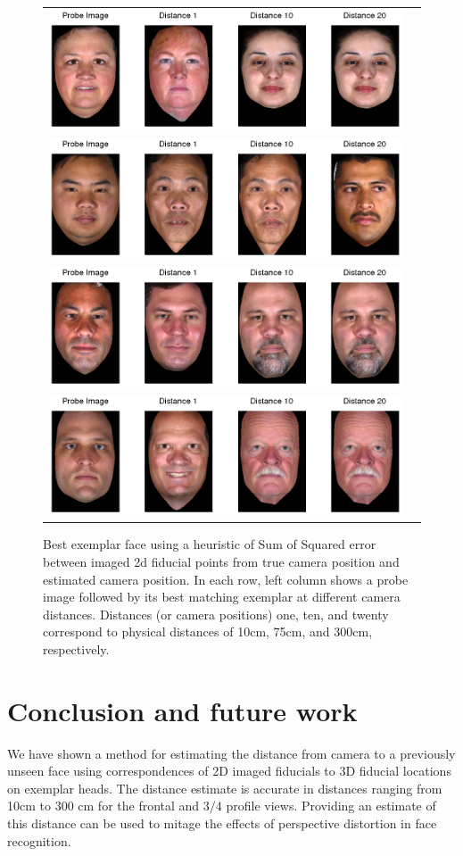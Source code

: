 \documentclass[runningheads]{llncs}
\begin{document}
\begin{figure}[h]
\centering
\begin{tabular}{cc}
\includegraphics[width=.7\linewidth]{resources/figures/best_exemplar1.png} \\
\includegraphics[width=.7\linewidth]{resources/figures/best_exemplar3.png} \\
\includegraphics[width=.7\linewidth]{resources/figures/best_exemplar10.png} \\
\includegraphics[width=.7\linewidth]{resources/figures/best_exemplar26.png}
\end{tabular}
\caption{Best exemplar face using a heuristic of Sum of Squared error between imaged 2d fiducial points from true camera position and estimated camera position.  In each row, left column shows a probe image followed by its best matching exemplar at different camera distances. Distances (or camera positions) one, ten, and twenty correspond to physical distances of 10cm, 75cm, and 300cm, respectively. }
\label{fig:bestexemplar}
\end{figure}

\section{Conclusion and future work} \label{sec:discussion}
We have shown a method for estimating the distance from camera to a previously unseen face using correspondences of 2D imaged fiducials to 3D fiducial locations on exemplar heads.  
The distance estimate is accurate in distances ranging from 10cm to 300 cm for the frontal and $3/4$ profile views.  
Providing an estimate of this distance can be used to mitage the effects of perspective distortion in face recognition.  
\end{document}
